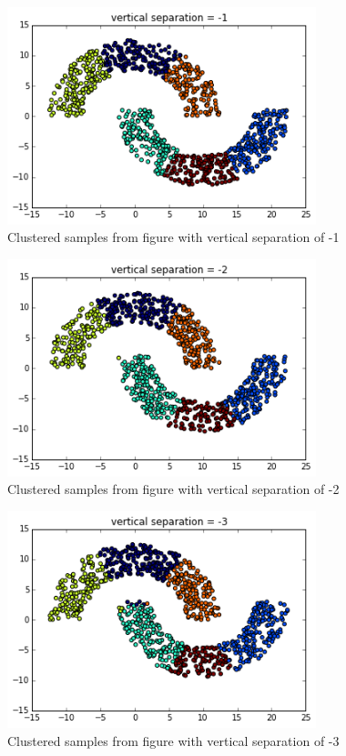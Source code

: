 \documentclass[paper=a4, fontsize=11pt]{scrartcl} %
\numberwithin{equation}{section} %
\numberwithin{figure}{section} %
\numberwithin{table}{section} %
\begin{document}
\begin{figure}[ht]
	\centering
  \includegraphics[width=0.8\textwidth]{vn1.png}
	\caption{Clustered samples from figure with vertical separation of -1}
	\label{figvn1}
\end{figure}
\begin{figure}[ht]
	\centering
  \includegraphics[width=0.8\textwidth]{vn2.png}
	\caption{Clustered samples from figure with vertical separation of -2}
	\label{figvn2}
\end{figure}
\begin{figure}[ht]
	\centering
  \includegraphics[width=0.8\textwidth]{vn3.png}
	\caption{Clustered samples from figure with vertical separation of -3}
	\label{figvn3}
\end{figure}
\end{document}
